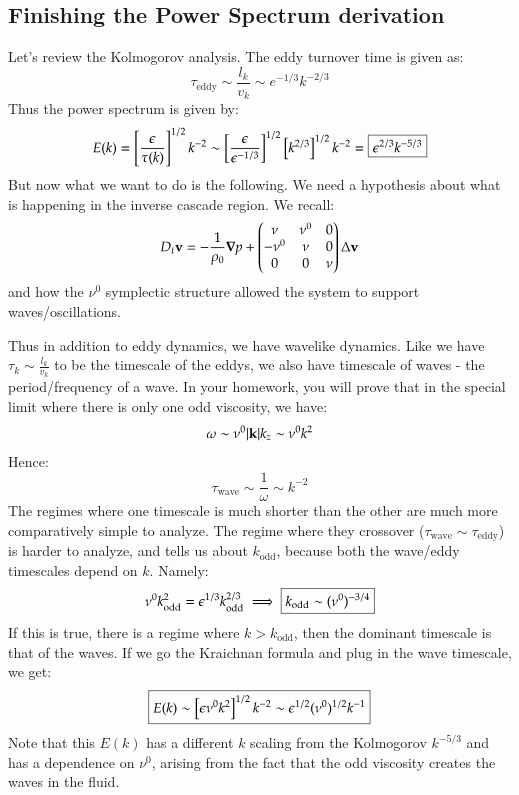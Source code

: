 \subsection{Finishing the Power Spectrum derivation}
Let's review the Kolmogorov analysis. The eddy turnover time is given as:
\begin{equation}
    \tau_{\text{eddy}} \sim \frac{l_k}{v_k} \sim e^{-1/3}k^{-2/3}
\end{equation}
Thus the power spectrum is given by:
\begin{equation}
    E(k) = \left[\frac{\epsilon}{\tau(k)}\right]^{1/2}k^{-2} \sim \left[\frac{\epsilon}{\epsilon^{-1/3}}\right]^{1/2}\left[k^{2/3}\right]^{1/2}k^{-2} = \boxed{\epsilon^{2/3}k^{-5/3}}
\end{equation}
But now what we want to do is the following. We need a hypothesis about what is happening in the inverse cascade region. We recall:
\begin{equation}
    D_t \v{v} = -\frac{1}{\rho_0}\nabla p + \m{\nu & \nu^0 & 0 \\ -\nu^0 & \nu & 0 \\ 0 & 0 & \nu}\Delta\v{v}
\end{equation}
and how the $\nu^0$ symplectic structure allowed the system to support waves/oscillations.

Thus in addition to eddy dynamics, we have wavelike dynamics. Like we have $\tau_k \sim \frac{l_k}{v_k}$ to be the timescale of the eddys, we also have timescale of waves - the period/frequency of a wave. In your homework, you will prove that in the special limit where there is only one odd viscosity, we have:
\begin{equation}
    \omega \sim \nu^0\lvert \mathbf{k} \rvert k_z \sim \nu^0 k^2
\end{equation}
Hence:
\begin{equation}
    \tau_{\text{wave}} \sim \frac{1}{\omega} \sim k^{-2}
\end{equation}
The regimes where one timescale is much shorter than the other are much more comparatively simple to analyze. The regime where they crossover ($\tau_{\text{wave}} \sim \tau_{\text{eddy}}$) is harder to analyze, and tells us about $k_{\text{odd}}$, because both the wave/eddy timescales depend on $k$. Namely:
\begin{equation}
    \nu^0 k_{\text{odd}}^2 = \epsilon^{1/3}k_{\text{odd}}^{2/3} \implies \boxed{k_{\text{odd}} \sim (\nu^0)^{-3/4}}
\end{equation}
If this is true, there is a regime where $k > k_{\text{odd}}$, then the dominant timescale is that of the waves. If we go the Kraichnan formula and plug in the wave timescale, we get:
\begin{equation}
    \boxed{E(k) \sim \left[\epsilon \nu^0 k^2\right]^{1/2}k^{-2} \sim \epsilon^{1/2}(\nu^0)^{1/2}k^{-1}}
\end{equation}
Note that this $E(k)$ has a different $k$ scaling from the Kolmogorov $k^{-5/3}$ and has a dependence on $\nu^0$, arising from the fact that the odd viscosity creates the waves in the fluid.

